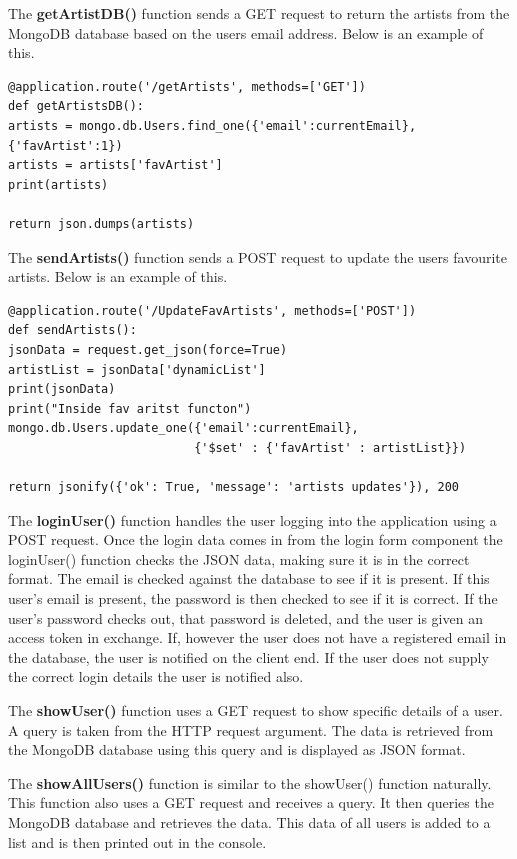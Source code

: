 The \textbf{getArtistDB()} function sends a GET request to return the artists from the MongoDB database based on the users email address.\newline
Below is an example of this.
\begin{verbatim} 
@application.route('/getArtists', methods=['GET'])
def getArtistsDB():
artists = mongo.db.Users.find_one({'email':currentEmail},{'favArtist':1})
artists = artists['favArtist']
print(artists)

return json.dumps(artists)
\end{verbatim}

The \textbf{sendArtists()} function sends a POST request to update the users favourite artists.\newline
Below is an example of this.
\begin{verbatim}
@application.route('/UpdateFavArtists', methods=['POST'])
def sendArtists():
jsonData = request.get_json(force=True)
artistList = jsonData['dynamicList']
print(jsonData)
print("Inside fav aritst functon")
mongo.db.Users.update_one({'email':currentEmail},
                          {'$set' : {'favArtist' : artistList}})

return jsonify({'ok': True, 'message': 'artists updates'}), 200
\end{verbatim}

The \textbf{loginUser()} function handles the user logging into the application using a POST request. Once the login data comes in from the login form component the loginUser() function checks the JSON data, making sure it is in the correct format. The email is checked against the database to see if it is present. If this user’s email is present, the password is then checked to see if it is correct.  If the user’s password checks out, that password is deleted, and the user is given an access token in exchange. 
If, however the user does not have a registered email in the database, the user is notified on the client end. If the user does not supply the correct login details the user is notified also.\newline

The \textbf{showUser()} function uses a GET request to show specific details of a user. A query is taken from the HTTP request argument. The data is retrieved from the MongoDB database using this query and is displayed as JSON format.\newline

The \textbf{showAllUsers()} function is similar to the showUser() function  naturally. This function also uses a GET request and receives a query. It then queries the MongoDB database and retrieves the data. This data of all users is added to a list and is then printed out in the console.\newline

